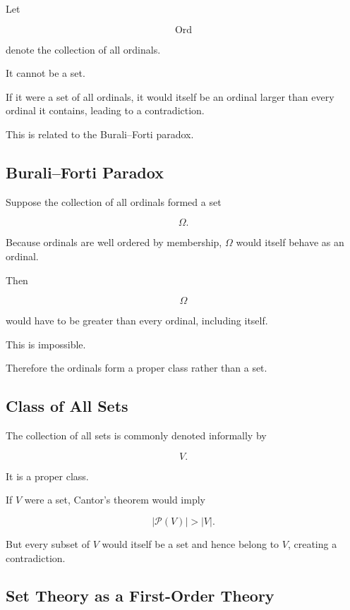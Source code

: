 Let

\[
\operatorname{Ord}
\]

denote the collection of all ordinals.

It cannot be a set.

If it were a set of all ordinals, it would itself be an ordinal larger than
every ordinal it contains, leading to a contradiction.

This is related to the Burali--Forti paradox.

\subsection{Burali--Forti Paradox}
\label{subsec:burali-forti-paradox}

Suppose the collection of all ordinals formed a set

\[
\Omega.
\]

Because ordinals are well ordered by membership, \(\Omega\) would itself
behave as an ordinal.

Then

\[
\Omega
\]

would have to be greater than every ordinal, including itself.

This is impossible.

Therefore the ordinals form a proper class rather than a set.

\subsection{Class of All Sets}
\label{subsec:class-of-all-sets}

The collection of all sets is commonly denoted informally by

\[
\boxed{
V.
}
\]

It is a proper class.

If \(V\) were a set, Cantor's theorem would imply

\[
|\mathcal{P}(V)|
>
|V|.
\]

But every subset of \(V\) would itself be a set and hence belong to \(V\),
creating a contradiction.

\subsection{Set Theory as a First-Order Theory}
\label{subsec:set-theory-first-order-theory}

